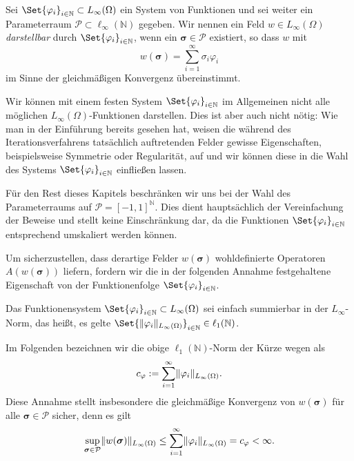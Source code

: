 \documentclass[../main.tex]{subfiles}
\begin{document}
\begin{Definition}
\label{definition:feld_entwickelbar}
    Sei $\Set{\varphi_{i}}_{i \in \mathbb{N}} \subset L_{\infty}(\Omega)$ ein System von Funktionen und sei weiter ein Parameterraum $\mathcal P \subset \ell_{\infty}(\mathbb{N})$ gegeben.
    Wir nennen ein Feld $w \in L_{\infty}(\Omega)$ \emph{darstellbar} durch $\Set{\varphi_{i}}_{i \in \mathbb{N}}$, wenn ein $\bm{\sigma} \in \mathcal P$ existiert, so dass $w$ mit
    \begin{equation}
        w(\bm\sigma) = \sum_{i = 1}^{\infty} \sigma_{i} \varphi_{i}
    \end{equation}
    im Sinne der gleichmäßigen Konvergenz übereinstimmt.
\end{Definition}

Wir können mit einem festen System $\Set{\varphi_{i}}_{i \in \mathbb{N}}$ im Allgemeinen nicht alle möglichen $L_{\infty}(\Omega)$-Funktionen darstellen.
Dies ist aber auch nicht nötig: Wie man in der Einführung bereits gesehen hat, weisen die während des Iterationsverfahrens tatsächlich auftretenden Felder gewisse Eigenschaften, beispielsweise Symmetrie oder Regularität, auf und wir können diese in die Wahl des Systems $\Set{\varphi_{i}}_{i \in \mathbb{N}}$ einfließen lassen.

\begin{Bemerkung}
    Für den Rest dieses Kapitels beschränken wir uns bei der Wahl des Parameterraums auf $\mathcal P = [-1, 1]^{\mathbb{N}}$.
    Dies dient hauptsächlich der Vereinfachung der Beweise und stellt keine Einschränkung dar, da die Funktionen $\Set{ \varphi_{i} }_{i \in \mathbb{N}}$ entsprechend umskaliert werden können.
\end{Bemerkung}

Um sicherzustellen, dass derartige Felder $w(\bm\sigma)$ wohldefinierte Operatoren $A(w(\bm\sigma))$ liefern, fordern wir die in der folgenden Annahme festgehaltene Eigenschaft von der Funktionenfolge $\Set{\varphi_{i}}_{i \in \mathbb{N}}$.

\begin{Annahme}
\label{annahme:system_l1_summierbar}
    Das Funktionensystem $\Set{ \varphi_{i} }_{i \in \mathbb{N}} \subset L_{\infty}(\Omega)$ sei einfach summierbar in der $L_{\infty}$-Norm, das heißt, es gelte $\Set{ \norm{\varphi_{i}}_{L_{\infty}(\Omega) } }_{i \in \mathbb{N}} \in \ell_{1}(\mathbb{N})$.
\end{Annahme}
%
Im Folgenden bezeichnen wir die obige $\ell_{1}(\mathbb{N})$-Norm der Kürze wegen als
\begin{equation}
\label{eq:system_l1_norm}
    c_{\varphi} := \sum_{i = 1}^{\infty} \lVert\varphi_{i}\rVert_{L_{\infty}(\Omega)}.
\end{equation}
Diese Annahme stellt insbesondere die gleichmäßige Konvergenz von $w(\bm\sigma)$ für alle $\bm\sigma \in \mathcal P$ sicher, denn es gilt
\begin{equation}
\label{eq:rz_feld_norm_schranke}
    \sup_{\bm\sigma \in \mathcal P} \lVert w(\bm\sigma)\rVert_{L_{\infty}(\Omega)} \leq \sum_{i = 1}^{\infty} \lVert\varphi_{i}\rVert_{L_{\infty}(\Omega)} = c_{\varphi} < \infty.
\end{equation}
\end{document}
